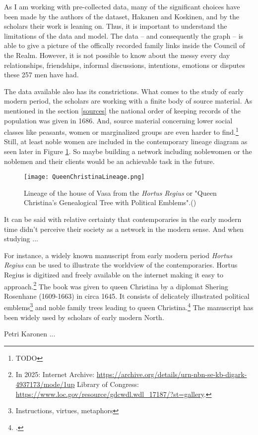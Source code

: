 As I am working with pre-collected data, many of the significant choices have been made by the authors of the dataset, Hakanen and Koskinen, and by the scholars their work is leaning on. Thus, it is important to understand the limitations of the data and model. The data – and consequently the graph – is able to give a picture of the offically recorded family links inside the Council of the Realm. However, it is not possible to know about the messy every day relationships, friendships, informal discussions, intentions, emotions or disputes these 257 men have had. 

The data available also has its constrictions. What comes to the study of early modern period, the scholars are working with a finite body of source material. As mentioned in the section \ref{sources} the national order of keeping records of the population was given in 1686. And, source material concerning lower social classes like peasants, women or marginalized groups are even harder to find.\footnote{TODO} Still, at least noble women are included in the contemporary lineage diagram as seen later in Figure \ref{queenlineage}. So maybe building a network including noblewomen or the noblemen and their clients would be an achievable task in the future.

\begin{figure}
	\texttt{[image: QueenChristinaLineage.png]}
	\caption{Lineage of the house of Vasa from the \textit{Hortus Regius} or "Queen Christina's Genealogical Tree with Political Emblems".(\cite{hortusregius})} 
	\centering
	\label{queenlineage}
\end{figure}

It can be said with relative certainty that contemporaries in the early modern time didn't perceive their society as a network in the modern sense. And when studying ...

For instance, a widely known manuscript from early modern period \textit{Hortus Regius} can be used to illustrate the worldview of the contemporaries. Hortus Regius is digitized and freely available on the internet making it easy to approach.\footnote{In 2025: Internet Archive: \url{https://archive.org/details/urn-nbn-se-kb-digark-4937173/mode/1up} Library of Congress: \url{https://www.loc.gov/resource/gdcwdl.wdl\_17187/?st=gallery}.} The book was given to queen Christina by a diplomat Shering Rosenhane (1609-1663) in circa 1645. It consists of delicately illustrated political emblems\footnote{Instructions, virtues, metaphors} and noble family trees leading to queen Christina.\footcites{congresslibrary}[p. 271.]{BlennowAnna} The manuscript has been widely used by scholars of early modern North.

Petri Karonen ...



